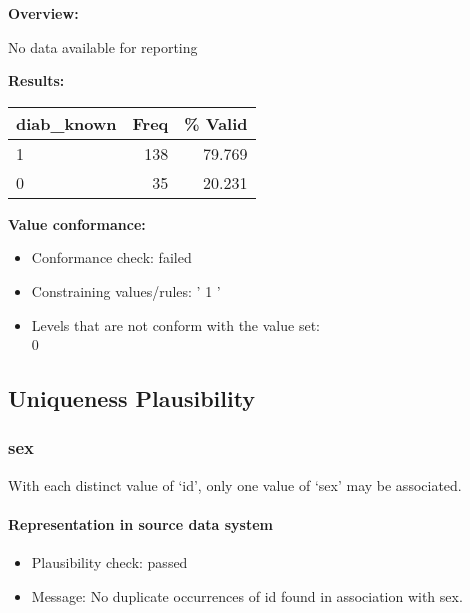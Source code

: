 \documentclass[
]{article}
\providecommand{\tightlist}{%
  \setlength{\itemsep}{0pt}\setlength{\parskip}{0pt}}
\begin{document}
\textbf{Overview:}

No data available for reporting

\textbf{Results:}\\

\begin{table}[H]
\centering
\begin{tabular}{l|r|r}
\hline
\textbf{diab\_known} & \textbf{Freq} & \textbf{\% Valid}\\
\hline
1 & 138 & 79.769\\
\hline
0 & 35 & 20.231\\
\hline
\end{tabular}
\end{table}

\textbf{Value conformance:}

\begin{itemize}
\tightlist
\item
  Conformance check: failed
\item
  Constraining values/rules: ' 1 '
\item
  Levels that are not conform with the value set:\\
  0
\end{itemize}

\hypertarget{uniqueness-plausibility}{%
\subsection{Uniqueness Plausibility}\label{uniqueness-plausibility}}

\hypertarget{sex-1}{%
\subsubsection{sex}\label{sex-1}}

With each distinct value of `id', only one value of `sex' may be
associated.

\hypertarget{representation-in-source-data-system-31}{%
\paragraph{Representation in source data
system}\label{representation-in-source-data-system-31}}

\begin{itemize}
\tightlist
\item
  Plausibility check: passed
\item
  Message: No duplicate occurrences of id found in association with sex.
\end{itemize}
\end{document}
